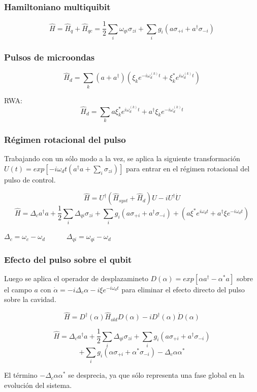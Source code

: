 \documentclass[xetex,mathserif,serif]{beamer}
\begin{document}
  \begin{frame}
      \frametitle{Hamiltoniano multiquibit}

$$\hat{H} = \hat{H}_q + \hat{H}_{qc} = \frac{1}{2} \sum\limits_i \omega_{qi} 
  \sigma_{zi} + \sum\limits_i g_i (a \sigma_{+ i} + a^\dagger \sigma_{- i})$$

  \end{frame}
  
  \begin{frame}
      \frametitle{Pulsos de microondas}

$$\hat{H}_d = \sum\limits_k (a+a^\dagger) (\xi_k e^{-i\omega_d^{(k)}t} + 
  \xi_k^*e^{i\omega_d^{(k)}t})$$

RWA: $$\hat{H}_d=\sum\limits_k a\xi_k^*e^{i\omega_d^{(k)}t}+
  a^\dagger\xi_ke^{-i\omega_d^{(k)}t}$$

  \end{frame}
  
  \begin{frame}
      \frametitle{Régimen rotacional del pulso}

\justify
Trabajando con un sólo modo a la vez, se aplica la siguiente transformación $U(t) 
= exp[-i \omega_d t(a^\dagger a + \sum\limits_i \sigma_{z i})]$ para entrar en 
el régimen rotacional del pulso de control.

$$\hat{H} = U^\dagger (\hat{H}_{syst} + \hat{H}_d) U - i U^\dagger \dot{U}$$
$$ \hat{H} = \Delta_c a^\dagger a + \frac{1}{2} \sum\limits_i \Delta_{qi} 
  \sigma_{zi} + \sum\limits_i g_i (a \sigma_{+ i} + a^\dagger \sigma_{- i}) + 
  (a\xi^*e^{i\omega_d t}+a^\dagger\xi e^{-i\omega_d t})$$

$\Delta_c = \omega_c - \omega_d \qquad \quad \Delta_{qi} = \omega_{qi} - \omega_d$

\end{frame}

\begin{frame}
    \frametitle{Efecto del pulso sobre el qubit}

\justify
Luego se aplica el operador de desplazamineto $D(\alpha) = exp[\alpha a^\dagger - 
\alpha^* a]$ sobre el campo $a$ con $\dot{\alpha} = -i \Delta_c \alpha -i \xi 
e^{-i \omega_d t}$ para eliminar el efecto directo del pulso sobre la cavidad.

$$\hat{H} = D^\dagger (\alpha) \hat{H}_{old} D(\alpha) -i D^\dagger(\alpha) \dot{D}(\alpha)$$

$$\hat{H} = \Delta_c a^\dagger a + \frac{1}{2} \sum\limits_i \Delta_{qi} 
  \sigma_{zi} + \sum\limits_i g_i (a \sigma_{+i} + a^\dagger \sigma_{-i})$$
$$ + \sum\limits_i g_i (\alpha \sigma_{+i} + \alpha^* \sigma_{-i}) - \Delta_c
  \alpha \alpha^* $$

El término $-\Delta_c \alpha \alpha^*$ se desprecia, ya que sólo representa 
una fase global en la evolución del sistema.

\end{frame}
\end{document}
